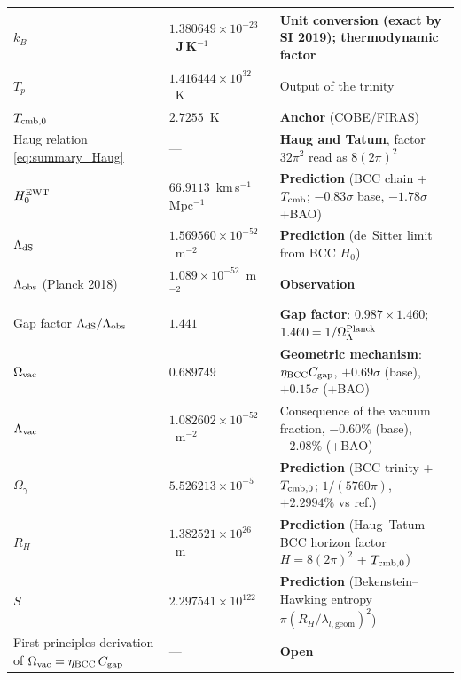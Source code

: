 \documentclass[10pt,a4paper]{article}
\begin{document}
\begin{table}[H]
\begin{tabularx}{\textwidth}{@{}l l X@{}}
		\(k_B\)                          & \(1.380649\times 10^{-23}\)~J\,K\(^{-1}\) & \textbf{Unit conversion} (exact by SI 2019); thermodynamic factor \\
		\midrule
		\(T_p\)                          & \(1.416444\times 10^{32}\)~K & Output of the trinity \\
		\(T_{\rm cmb,0}\)                & \(2.7255\)~K             & \textbf{Anchor} (COBE/FIRAS) \\
		\midrule
		Haug relation \eqref{eq:summary_Haug} & --- & \textbf{Haug and Tatum}, factor $32\pi^2$ read as $8(2\pi)^2$ \\
		\(H_0^{\rm EWT}\)                & \(66.9113\)~km\,s\(^{-1}\)\,Mpc\(^{-1}\) & \textbf{Prediction} (BCC chain + \(T_{\rm cmb}\); \(-0.83\sigma\) base, \(-1.78\sigma\) +BAO) \\
		\(\Lambda_{\rm dS}\)            & \(1.569560\times 10^{-52}\)~m\(^{-2}\) & \textbf{Prediction} (de~Sitter limit from BCC \(H_0\)) \\
		\midrule
		\(\Lambda_{\rm obs}\) (Planck 2018) & \(1.089\times 10^{-52}\)~m\(^{-2}\) & \textbf{Observation} \\
		Gap factor \(\Lambda_{\rm dS}/\Lambda_{\rm obs}\) & \(1.441\) & \textbf{Gap factor}: \(0.987\times 1.460\); \(1.460 = 1/\Omega_\Lambda^{\rm Planck}\) \\
		\midrule
		\(\Omega_{\rm vac}\)            & \(0.689749\)             & \textbf{Geometric mechanism}: \(\eta_{\rm BCC}C_{\rm gap}\), \(+0.69\sigma\) (base), \(+0.15\sigma\) (+BAO) \\
		\(\Lambda_{\rm vac}\)          & \(1.082602\times 10^{-52}\)~m\(^{-2}\) & Consequence of the vacuum fraction, $-0.60\%$ (base), $-2.08\%$ (+BAO) \\
		\(\Omega_\gamma\) & \(5.526213\times 10^{-5}\) & \textbf{Prediction} (BCC trinity + \(T_{\rm cmb,0}\); \(1/(5760\pi)\), \(+2.2994\%\) vs ref.) \\
		\(R_H\) & \(1.382521\times 10^{26}\)~m & \textbf{Prediction} (Haug--Tatum + BCC horizon factor \(H = 8(2\pi)^2\) + \(T_{\rm cmb,0}\)) \\
		\(S\) & \(2.297541\times 10^{122}\) & \textbf{Prediction} (Bekenstein--Hawking entropy \(\pi(R_H/\lambda_{l,\text{geom}})^2\)) \\
		\midrule
		First-principles derivation of \(\Omega_{\rm vac} = \eta_{\rm BCC}\,C_{\rm gap}\) & --- & \textbf{Open} \\
		\bottomrule
	\end{tabularx}
\end{table}
\end{document}
